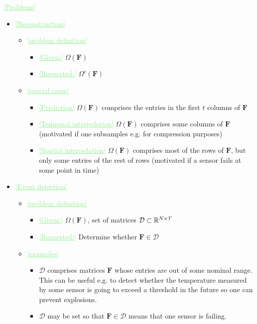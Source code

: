 \documentclass[11pt,final,onecolumn]{IEEEtran}
\newcommand{\cmt}[1]{\noindent\textcolor{lightgreen}{\underline{[#1]}}} %
\newcommand{\cmt}[1]{} %
\begin{document}
\cmt{Problems}
\begin{itemize}
\item\cmt{Reconstruction}
  \begin{itemize}
  \item \cmt{problem definition}
    \begin{itemize}
    \item \cmt{Given:} $\Omega(\bm F)$
    \item \cmt{Requested:} $\Omega^c(\bm F)$
    \end{itemize}
  \item\cmt{special cases}
    \begin{itemize}
    \item\cmt{Prediction}  $\Omega(\bm F)$ comprises the entries in the first $t$
        columns of $\bm F$
    \item\cmt{Temporal interpolation} $\Omega(\bm F)$ comprises some
      columns of $\bm F$ (motivated if one subsamples e.g. for
      compression purposes)
    \item\cmt{Spatial interpolation} $\Omega(\bm F)$ comprises most of
      the rows of $\bm F$, but only some entries of the rest of rows
      (motivated if a sensor fails at some point in time)
    \end{itemize}
  \end{itemize}
\item\cmt{Event detection}
  \begin{itemize}
  \item\cmt{problem definition}
    \begin{itemize}
    \item \cmt{Given:} $\Omega(\bm F)$, set of matrices $\mathcal{D}\subset \mathbb{R}^{N \times T}$
    \item \cmt{Requested:} Determine whether $\bm F\in \mathcal{D}$
    \end{itemize}
  \item\cmt{examples}
    \begin{itemize}
    \item $\mathcal{D}$ comprises matrices $\bm F$ whose
      entries are out of some nominal range. This can be useful e.g. to
      detect whether the temperature measured by some sensor is going
      to exceed a threshold in the future so one can prevent
      explosions. 
    \item $\mathcal{D}$ may be set so that $\bm F\in \mathcal{D}$
      means that one sensor is failing. 
    \end{itemize}
  \end{itemize}

\end{itemize}
\end{document}

